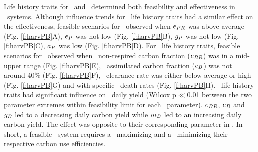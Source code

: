 \documentclass[../thesis.tex]{subfiles} %
\begin{document}
Life history traits for \phy\ and \bac\ determined both feasibility and effectiveness in \PBH\ systems.  Although influence trends for \phy\ life history traits had a similar effect on the effectiveness, feasible scenarios for \PBH\ observed when $e_{PR}$ was above average (Fig. \ref{f:harvPB}A), $e_P$ was not low (Fig. \ref{f:harvPB}B), $g_P$ was not low (Fig. \ref{f:harvPB}C), $a_P$ was low (Fig. \ref{f:harvPB}D).  For \bac\ life history traits, feasible scenarios for \PBH\ observed when \bac\ non-respired carbon fraction ($e_{BR}$) was in a mid-upper range (Fig. \ref{f:harvPB}E), \bac\ assimilated carbon fraction ($e_B$) was not around 40\% (Fig. \ref{f:harvPB}F), \bac\ clearance rate was either below average or high (Fig. \ref{f:harvPB}G) and with specific \bac\ death rates (Fig. \ref{f:harvPB}H).  \Bac\ life history traits had significant influence on \PBH\ daily yield (Wilcox p$\ll$0.01 between the two parameter extremes within feasibility limit for each \bac\ parameter).  $e_{BR}$, $e_B$ and $g_B$ led to a decreasing daily carbon yield while $m_B$ led to an increasing daily carbon yield.  The effect was opposite to their corresponding parameter in \phy.  In short, a feasible \PBH\ system requires a \phy\ maximizing and a \bac\ minimizing their respective carbon use efficiencies.
\end{document}
